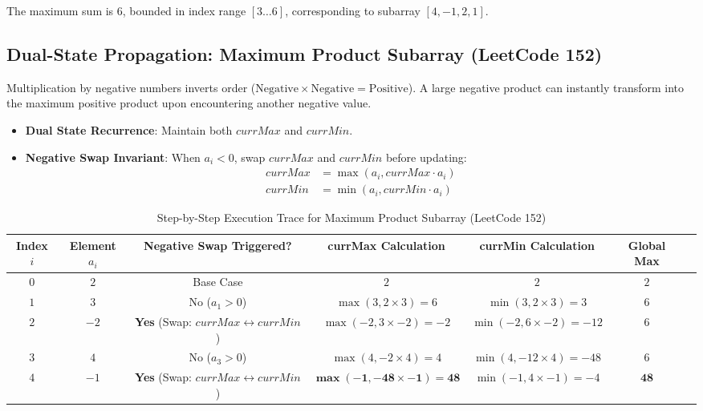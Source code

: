 \documentclass[10pt,journal,compsoc,onecolumn]{IEEEtran}
\begin{document}
The maximum sum is $6$, bounded in index range $[3 \dots 6]$, corresponding to subarray $[4, -1, 2, 1]$.

\subsection{Dual-State Propagation: Maximum Product Subarray (LeetCode 152)}
Multiplication by negative numbers inverts order ($\text{Negative} \times \text{Negative} = \text{Positive}$). A large negative product can instantly transform into the maximum positive product upon encountering another negative value.
\begin{itemize}
    \item \textbf{Dual State Recurrence}: Maintain both $currMax$ and $currMin$.
    \item \textbf{Negative Swap Invariant}: When $a_i < 0$, swap $currMax$ and $currMin$ before updating:
    \begin{align}
    currMax &= \max(a_i, currMax \cdot a_i) \\
    currMin &= \min(a_i, currMin \cdot a_i)
    \end{align}
\end{itemize}

\begin{table}[htbp]
\caption{Step-by-Step Execution Trace for Maximum Product Subarray (LeetCode 152)}
\label{tab:trace_lc152}
\centering
\begin{tabular}{ccccccc}
\toprule
\textbf{Index $i$} & \textbf{Element $a_i$} & \textbf{Negative Swap Triggered?} & \textbf{currMax Calculation} & \textbf{currMin Calculation} & \textbf{Global Max} \\
\midrule
$0$ & $2$ & Base Case & $2$ & $2$ & $2$ \\
$1$ & $3$ & No ($a_1 > 0$) & $\max(3, 2 \times 3) = 6$ & $\min(3, 2 \times 3) = 3$ & $6$ \\
$2$ & $-2$ & \textbf{Yes} (Swap: $currMax \leftrightarrow currMin$) & $\max(-2, 3 \times -2) = -2$ & $\min(-2, 6 \times -2) = -12$ & $6$ \\
$3$ & $4$ & No ($a_3 > 0$) & $\max(4, -2 \times 4) = 4$ & $\min(4, -12 \times 4) = -48$ & $6$ \\
$4$ & $-1$ & \textbf{Yes} (Swap: $currMax \leftrightarrow currMin$) & $\mathbf{\max(-1, -48 \times -1) = 48}$ & $\min(-1, 4 \times -1) = -4$ & $\mathbf{48}$ \\
\bottomrule
\end{tabular}
\end{table}
\end{document}
